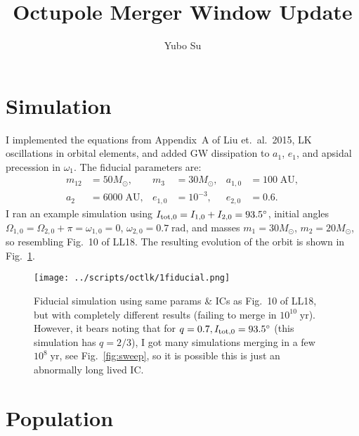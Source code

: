 \documentclass[11pt,
        usenames, %
        dvipsnames %
    ]{article}
\begin{document}
\onehalfspacing

\title{Octupole Merger Window Update}
\author{Yubo Su}

\maketitle

\section{Simulation}

I implemented the equations from Appendix~A of Liu et.\ al.\ 2015, LK
oscillations in orbital elements, and added GW dissipation to $a_1$, $e_1$, and
apsidal precession in $\omega_1$. The fiducial parameters are:
\begin{align*}
    m_{12} &= 50M_{\odot}, &
    m_3 &= 30 M_{\odot}, &
    a_{1,0} &= 100\;\mathrm{AU}, \\
    a_2 &= 6000\;\mathrm{AU},&
    e_{1, 0} &= 10^{-3}, &
    e_{2, 0} &= 0.6.
\end{align*}
I ran an example simulation using $I_{\rm tot, 0} = I_{1, 0} + I_{2, 0} =
93.5^\circ$, initial angles $\Omega_{1, 0} = \Omega_{2, 0} + \pi = \omega_{1, 0}
= 0$, $\omega_{2, 0} = 0.7\;\mathrm{rad}$, and masses $m_1 = 30M_{\odot}$, $m_2
= 20M_{\odot}$, so resembling Fig.~10 of LL18. The resulting evolution of the
orbit is shown in Fig.~\ref{fig:fiducial}.
\begin{figure}
    \centering
    \texttt{[image: ../scripts/octlk/1fiducial.png]}
    \caption{Fiducial simulation using same params \& ICs as Fig.~10 of LL18,
    but with completely different results (failing to merge in
    $10^{10}\;\mathrm{yr}$). However, it bears noting that for $q = 0.7, I_{\rm
    tot, 0} = 93.5^\circ$ (this simulation has $q = 2/3$), I got many
    simulations merging in a few $10^8\;\mathrm{yr}$, see Fig.~\ref{fig:sweep},
    so it is possible this is just an abnormally long lived
    IC.}\label{fig:fiducial}
\end{figure}

\section{Population}
\end{document}
